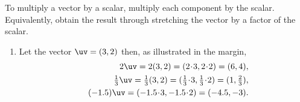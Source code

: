 \begin{example} \label{eg:}
To multiply a vector by a scalar, multiply each component by the scalar. 
Equivalently, obtain the result through stretching the vector by a factor of the scalar.
\begin{enumerate}
\item Let the vector \(\uv=(3,2)\) then, as illustrated in the margin,
\begin{eqnarray*}&&
2\uv=2(3,2) =(2\cdot3,2\cdot2) =(6,4),
\\&&
\tfrac13\uv=\tfrac13(3,2) =(\tfrac13\cdot3,\tfrac13\cdot2) =(1,\tfrac23),
\\&&
(-1.5)\uv =(-1.5\cdot3,-1.5\cdot2) =(-4.5,-3).
\end{eqnarray*}


\end{enumerate}
\end{example}
